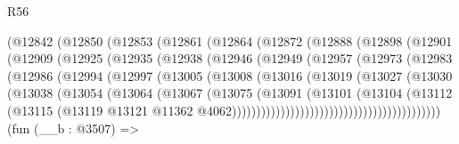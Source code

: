 \begin{lexlean}{R56}
\begin{coremodule}
              (@12842
                (@12850
                  (@12853
                    (@12861
                      (@12864
                        (@12872
                          (@12888
                            (@12898
                              (@12901
                                (@12909
                                  (@12925
                                    (@12935
                                      (@12938
                                        (@12946
                                          (@12949
                                            (@12957
                                              (@12973
                                                (@12983
                                                  (@12986
                                                    (@12994
                                                      (@12997
                                                        (@13005
                                                          (@13008
                                                            (@13016
                                                              (@13019
                                                                (@13027
                                                                  (@13030
                                                                    (@13038
                                                                      (@13054
                                                                        (@13064
                                                                          (@13067
                                                                            (@13075
                                                                              (@13091
                                                                                (@13101
                                                                                  (@13104
                                                                                    (@13112
                                                                                      (@13115
                                                                                        (@13119
                                                                                          @13121
                                                                                          @11362
                                                                                          @4062)))))))))))))))))))))))))))))))))))))))))))
    (fun (__b : @3507) =>

\end{coremodule}
\end{lexlean}
